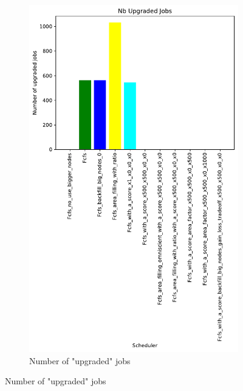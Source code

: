 \documentclass[a4paper]{article}
\begin{document}
\begin{figure}[H]
\begin{subfigure}[b]{0.4\linewidth}\centering\includegraphics[width=0.7\linewidth]{MBSS/plot/Results_Size_And_Data_2022-03-01->2022-03-03_V10000_Nb_Upgraded_Jobs_450_128_32_256_4_1024.pdf}\caption{Number of "upgraded" jobs}\label{45}\end{subfigure}

\end{figure}
\end{document}
